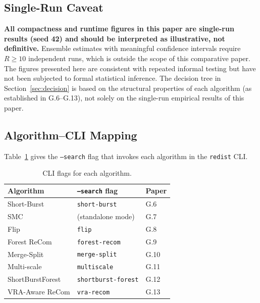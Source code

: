 \subsection{Single-Run Caveat}
\label{sec:caveat}

\textbf{All compactness and runtime figures in this paper are single-run
results (seed 42) and should be interpreted as illustrative, not definitive.}
Ensemble estimates with meaningful confidence intervals require $R \geq 10$
independent runs, which is outside the scope of this comparative paper.
The figures presented here are consistent with repeated informal testing
but have not been subjected to formal statistical inference.
The decision tree in Section~\ref{sec:decision} is based on the
structural properties of each algorithm (as established in G.6--G.13),
not solely on the single-run empirical results of this paper.

\subsection{Algorithm--CLI Mapping}

Table~\ref{tab:cli} gives the \texttt{--search} flag that invokes each
algorithm in the \texttt{redist} CLI.

\begin{table}[ht]
\centering
\caption{CLI flags for each algorithm.}
\label{tab:cli}
\begin{tabular}{@{}lll@{}}
\toprule
Algorithm & \texttt{--search} flag & Paper \\
\midrule
Short-Burst     & \texttt{short-burst}           & G.6 \\
SMC             & (standalone mode)              & G.7 \\
Flip            & \texttt{flip}                  & G.8 \\
Forest ReCom    & \texttt{forest-recom}          & G.9 \\
Merge-Split     & \texttt{merge-split}           & G.10 \\
Multi-scale     & \texttt{multiscale}            & G.11 \\
ShortBurstForest & \texttt{shortburst-forest}   & G.12 \\
VRA-Aware ReCom & \texttt{vra-recom}             & G.13 \\
\bottomrule
\end{tabular}
\end{table}
